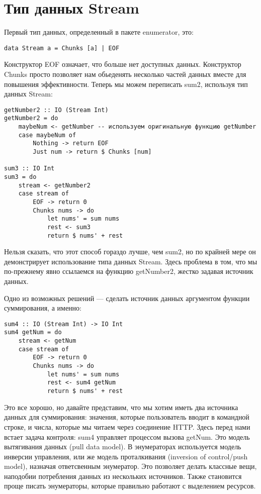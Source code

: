 \section{Тип данных Stream}

Первый тип данных, определенный в пакете enumerator, это: 

\begin{lstlisting}
data Stream a = Chunks [a] | EOF
\end{lstlisting}

Конструктор EOF означает, что больше нет доступных данных. Конструктор Chunks просто позволяет нам обьеденять несколько частей данных вместе для повышения эффективности. Теперь мы можем переписать sum2, используя тип данных Stream:

\begin{lstlisting}
getNumber2 :: IO (Stream Int)
getNumber2 = do
    maybeNum <- getNumber -- используем оригинальную функцию getNumber
    case maybeNum of
        Nothing -> return EOF
        Just num -> return $ Chunks [num]

sum3 :: IO Int
sum3 = do
    stream <- getNumber2
    case stream of
        EOF -> return 0
        Chunks nums -> do
            let nums' = sum nums
            rest <- sum3
            return $ nums' + rest
\end{lstlisting}%

Нельзя сказать, что этот способ гораздо лучше, чем sum2, но по крайней мере он демонстрирует использование типа данных Stream. Здесь проблема в том, что мы по-прежнему явно ссылаемся на функцию getNumber2, жестко задавая источник данных.

Одно из возможных решений --- сделать источник данных аргументом функции суммирования, а именно:

\begin{lstlisting}
sum4 :: IO (Stream Int) -> IO Int
sum4 getNum = do
    stream <- getNum
    case stream of
        EOF -> return 0
        Chunks nums -> do
            let nums' = sum nums
            rest <- sum4 getNum
            return $ nums' + rest
\end{lstlisting}%

Это все хорошо, но давайте представим, что мы хотим иметь два источника данных для суммирования: значения, которые пользователь вводит в командной строке, и числа, которые мы читаем через соединение HTTP. Здесь перед нами встает задача контроля: sum4 управляет процессом вызова getNum. Это модель вытягивания данных (pull data model). В энумераторах используется модель инверсии управления, или же модель проталкивания (inversion of control/push model), назначая ответсвенным энумератор. Это позволяет делать классные вещи, наподобии потребления данных из нескольких источников. Также становится проще писать энумераторы, которые правильно работают с выделением ресурсов.

